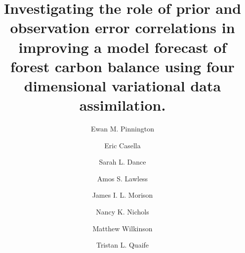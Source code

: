 \documentclass[review]{elsarticle}
\begin{document}
\begin{frontmatter}

\title{Investigating the role of prior and observation error correlations in improving a model forecast of forest carbon balance using four dimensional variational data assimilation.}


\author[address1]{Ewan M. Pinnington}

\author[address3]{Eric Casella}

\author[address1,address2]{Sarah L. Dance}

\author[address1,address2,address4]{Amos S. Lawless}

\author[address3]{James I. L. Morison}

\author[address1,address2,address4]{Nancy K. Nichols}

\author[address3]{Matthew Wilkinson}

\author[address1,address4]{Tristan L. Quaife}


\address[address1]{Department of Meteorology, University of Reading, Reading, UK}
\address[address2]{Department of Mathematics and Statistics, University of Reading, Reading, UK}
\address[address3]{Centre for Sustainable Forestry and Climate Change, Forest Research, Alice Holt, Farnham, UK}
\address[address4]{National Centre for Earth Observation, University of Reading, Reading, UK}



\end{frontmatter}
\end{document}
